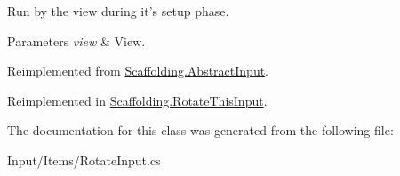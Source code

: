 Run by the view during it's setup phase. 


\begin{DoxyParams}{Parameters}
{\em view} & View.\\
\hline
\end{DoxyParams}


Reimplemented from \hyperlink{class_scaffolding_1_1_abstract_input_a598859c6342920d2b0c985310e6e9476}{Scaffolding.\+Abstract\+Input}.



Reimplemented in \hyperlink{class_scaffolding_1_1_rotate_this_input_a9e0fc73644310f1efd1f49e692638c89}{Scaffolding.\+Rotate\+This\+Input}.



The documentation for this class was generated from the following file\+:\begin{DoxyCompactItemize}
\item 
Input/\+Items/Rotate\+Input.\+cs\end{DoxyCompactItemize}
